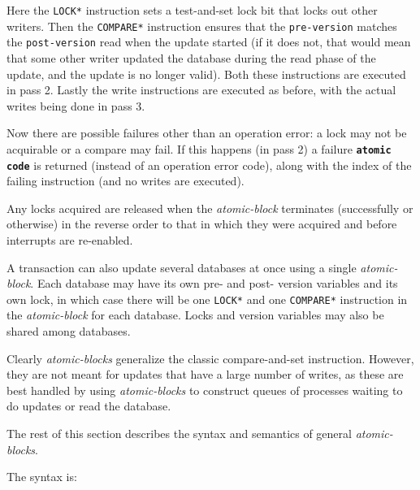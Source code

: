 \documentclass[12pt]{article}
\newcommand{\TT}[1]{{\tt \bfseries #1}}
\begin{document}
Here the {\tt *LOCK*} instruction sets a test-and-set lock bit that
locks out other writers.  Then the {\tt *COMPARE*} instruction
ensures that the {\tt pre-version} matches the {\tt post-version}
read when the update
started (if it does not, that would mean that some other writer updated the
database during the read phase of the update, and the update is
no longer valid).  Both these instructions are executed in pass 2.
Lastly the write instructions are executed as before, with the actual
writes being done in pass 3.

Now there are possible failures other than an operation error:
a lock may not be acquirable or a compare may fail.  If this happens
(in pass 2) a failure \TT{atomic code} is returned
(instead of an operation error code), along with the index of the
failing instruction (and no writes are executed).

Any locks acquired are released when the {\em atomic-block} terminates
(successfully or otherwise)
in the reverse order to that in which they were acquired and before
interrupts are re-enabled.

A transaction can also update several databases at once using a single
{\em atomic-block}.  Each database
may have its own pre- and post- version variables and its own lock,
in which case there will be one {\tt *LOCK*} and one {\tt *COMPARE*}
instruction in the {\em atomic-block} for each database.  Locks and
version variables may also be shared among databases.

Clearly {\em atomic-blocks} generalize
the classic compare-and-set instruction.
However, they are not meant for updates that have a large number of
writes, as these are best handled by using {\em atomic-blocks} to construct
queues of processes waiting to do updates or read the database.

The rest of this section describes the syntax and semantics
of general {\em atomic-blocks}.

The syntax is:
\end{document}
